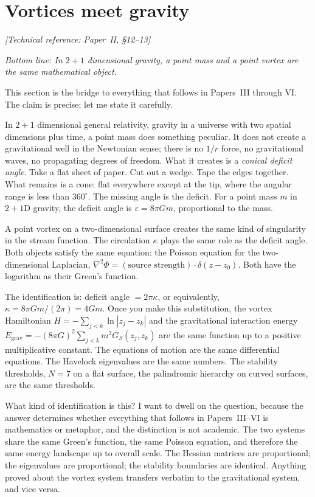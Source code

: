 \section{Vortices meet gravity}
\noindent\textit{[Technical reference: Paper~II, \S12--13]}

\medskip

\noindent\textit{Bottom line: In $2{+}1$ dimensional gravity, a point
mass and a point vortex are the same mathematical object.}

\medskip

This section is the bridge to everything that follows in Papers~III
through VI. The claim is precise; let me state it carefully.

In $2+1$ dimensional general relativity, gravity in a universe with
two spatial dimensions plus time, a point mass does something
peculiar. It does not create a gravitational well in the Newtonian
sense; there is no $1/r$ force, no gravitational waves, no propagating
degrees of freedom. What it creates is a \emph{conical deficit angle}.
Take a flat sheet of paper. Cut out a wedge. Tape the edges together.
What remains is a cone: flat everywhere except at the tip, where the
angular range is less than $360^\circ$. The missing angle is the
deficit. For a point mass $m$ in $2+1$D gravity, the deficit angle is
$\varepsilon = 8\pi G m$, proportional to the mass.

A point vortex on a two-dimensional surface creates the same kind of
singularity in the stream function. The circulation $\kappa$ plays
the same role as the deficit angle. Both objects satisfy the same
equation: the Poisson equation for the two-dimensional Laplacian,
$\nabla^2\Phi = (\text{source strength})\cdot\delta(z - z_0)$.
Both have the logarithm as their Green's function.

The identification is: deficit angle $= 2\pi\kappa$, or equivalently,
$\kappa = 8\pi Gm/(2\pi) = 4Gm$. Once you make this substitution, the
vortex Hamiltonian $H = -\sum_{j<k}\ln|z_j - z_k|$ and the
gravitational interaction energy
$E_{\mathrm{grav}} = -(8\pi G)^2\sum_{j<k}m^2 G_S(z_j, z_k)$ are
the same function up to a positive multiplicative constant. The
equations of motion are the same differential equations. The Havelock
eigenvalues are the same numbers. The stability thresholds, $N = 7$
on a flat surface, the palindromic hierarchy on curved surfaces, are
the same thresholds.

What kind of identification is this? I want to dwell on the question,
because the answer determines whether everything that follows in
Papers~III--VI is mathematics or metaphor, and the distinction is
not academic. The two systems share the same Green's function, the
same Poisson equation, and therefore the same energy landscape up to
overall scale. The Hessian matrices are proportional; the eigenvalues are
proportional; the stability boundaries are identical. Anything proved
about the vortex system transfers verbatim to the gravitational system,
and vice versa.

